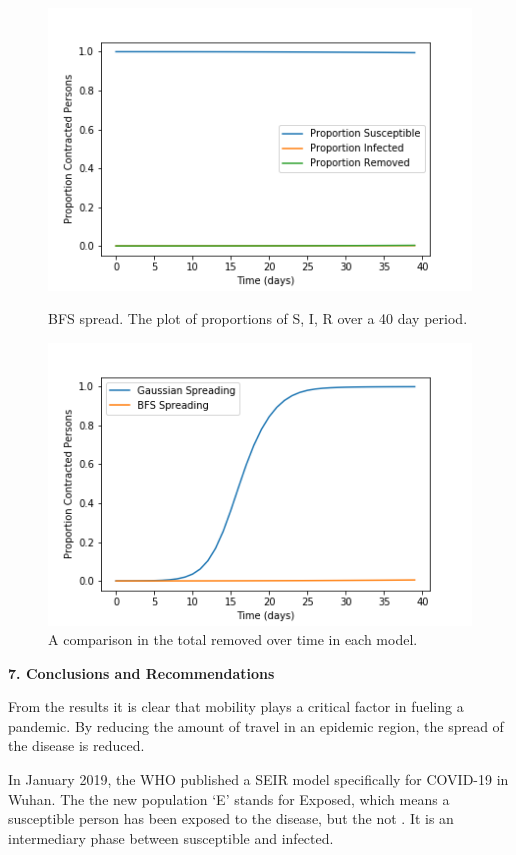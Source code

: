 \documentclass[a4paper]{article}
\begin{document}
\begin{figure}[ht]
  \includegraphics[scale=0.75]{../no_quarantine/no_quarantine_plt.png}
  \centering
  \caption{BFS spread. The plot of proportions of S, I, R over a 40 day period.}
  \includegraphics[scale=0.75]{../combined_spread.png}
  \centering
  \caption{A comparison in the total removed over time in each model.}
\end{figure}

\begin{center}
  \textbf{7. Conclusions and Recommendations}
\end{center}

From the results it is clear that mobility plays a critical factor in fueling a
pandemic. By reducing the amount of travel in an epidemic region, the spread of
the disease is reduced.

In January 2019, the WHO published a SEIR model specifically for COVID-19 in
Wuhan. The the new population `E' stands for Exposed, which means a susceptible
person has been exposed to the disease, but the not . It is an intermediary phase between susceptible and infected.
\end{document}
